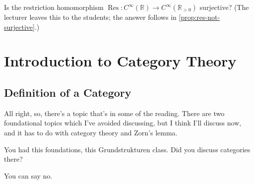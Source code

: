 \begin{content}

\begin{question}
Is the restriction homomorphism $\operatorname{Res} \colon C^\infty(\mathbb{R}) \to C^\infty(\mathbb{R}_{>0})$ surjective? (The lecturer leaves this to the students; the answer follows in \cref{prop:res-not-surjective}.)
\end{question}
\end{content}

\begin{hidden}
\end{hidden}

\section{Introduction to Category Theory}

\subsection{Definition of a Category}

\begin{speech}[01:06:13 - 01:07:09]
All right, so, there's a topic that's in some of the reading. There are two foundational topics which I've avoided discussing, but I think I'll discuss now, and it has to do with category theory and Zorn's lemma.

You had this foundations, this Grundstrukturen class. Did you discuss categories there?

You can say no.
\end{speech}

